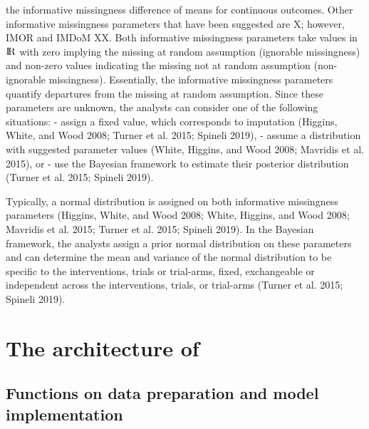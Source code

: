 the informative missingness difference of means for continuous outcomes. Other
informative missingness parameters that have been suggested are X; however, IMOR and IMDoM XX. Both
informative missingness parameters take values in \({\rm I\!R}\) with zero implying
the missing at random assumption (ignorable missingness) and non-zero values
indicating the missing not at random assumption (non-ignorable missingness).
Essentially, the informative missingness parameters quantify departures from the
missing at random assumption. Since these parameters are unknown, the analysts can
consider one of the following situations:
- assign a fixed value, which corresponds to imputation (Higgins, White, and Wood 2008; Turner et al. 2015; Spineli 2019),
- assume a distribution with suggested parameter values (White, Higgins, and Wood 2008; Mavridis et al. 2015), or
- use the Bayesian framework to estimate their posterior distribution (Turner et al. 2015; Spineli 2019).

Typically, a normal distribution is assigned on both informative missingness parameters
(Higgins, White, and Wood 2008; White, Higgins, and Wood 2008; Mavridis et al. 2015; Turner et al. 2015; Spineli 2019). In the Bayesian
framework, the analysts assign a prior normal distribution on these parameters and
can determine the mean and variance of the normal distribution to be specific to the
interventions, trials or trial-arms, fixed, exchangeable or independent across the
interventions, trials, or trial-arms (Turner et al. 2015; Spineli 2019).

\hypertarget{the-architecture-of}{%
\section{\texorpdfstring{The architecture of }{The architecture of }}\label{the-architecture-of}}

\hypertarget{functions-on-data-preparation-and-model-implementation}{%
\subsection{Functions on data preparation and model implementation}\label{functions-on-data-preparation-and-model-implementation}}

